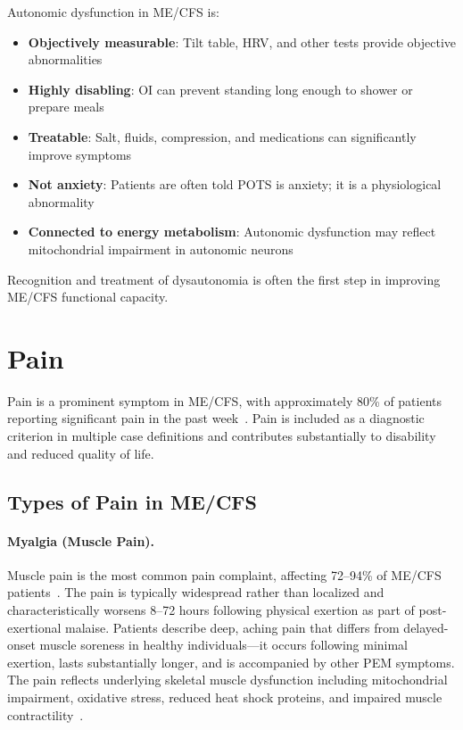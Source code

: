 Autonomic dysfunction in ME/CFS is:
\begin{itemize}
    \item \textbf{Objectively measurable}: Tilt table, HRV, and other tests provide objective abnormalities
    \item \textbf{Highly disabling}: OI can prevent standing long enough to shower or prepare meals
    \item \textbf{Treatable}: Salt, fluids, compression, and medications can significantly improve symptoms
    \item \textbf{Not anxiety}: Patients are often told POTS is anxiety; it is a physiological abnormality
    \item \textbf{Connected to energy metabolism}: Autonomic dysfunction may reflect mitochondrial impairment in autonomic neurons
\end{itemize}

Recognition and treatment of dysautonomia is often the first step in improving ME/CFS functional capacity.

\section{Pain}
\label{sec:pain}

Pain is a prominent symptom in ME/CFS, with approximately 80\% of patients reporting significant pain in the past week~\cite{Unger2017pain}. Pain is included as a diagnostic criterion in multiple case definitions and contributes substantially to disability and reduced quality of life.

\subsection{Types of Pain in ME/CFS}
\label{subsec:pain-types}

\paragraph{Myalgia (Muscle Pain).}
Muscle pain is the most common pain complaint, affecting 72--94\% of ME/CFS patients~\cite{Nijs2012muscle}. The pain is typically widespread rather than localized and characteristically worsens 8--72 hours following physical exertion as part of post-exertional malaise. Patients describe deep, aching pain that differs from delayed-onset muscle soreness in healthy individuals---it occurs following minimal exertion, lasts substantially longer, and is accompanied by other PEM symptoms. The pain reflects underlying skeletal muscle dysfunction including mitochondrial impairment, oxidative stress, reduced heat shock proteins, and impaired muscle contractility~\cite{Jammes2021muscle}.

